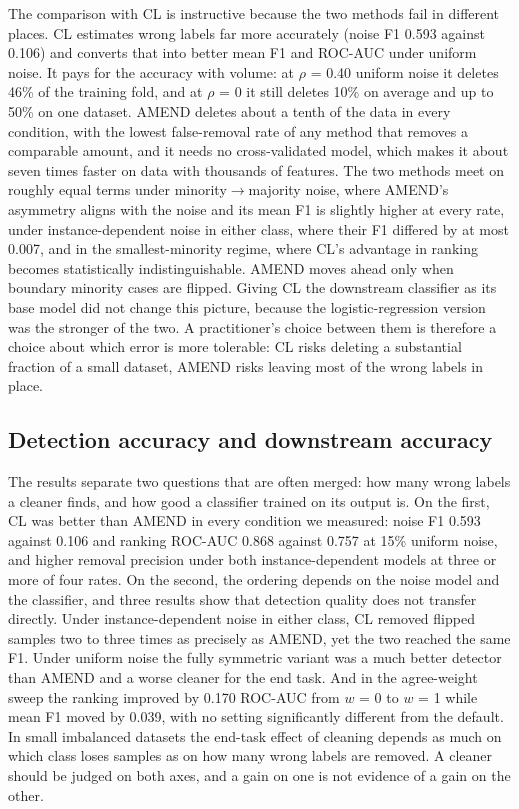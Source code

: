 \documentclass[conference]{IEEEtran}
\begin{document}
The comparison with CL is instructive because the two methods fail in different places. CL estimates wrong labels far more accurately (noise F1 0.593 against 0.106) and converts that into better mean F1 and ROC-AUC under uniform noise. It pays for the accuracy with volume: at $\rho $ = 0.40 uniform noise it deletes 46\% of the training fold, and at $\rho $ = 0 it still deletes 10\% on average and up to 50\% on one dataset. AMEND deletes about a tenth of the data in every condition, with the lowest false-removal rate of any method that removes a comparable amount, and it needs no cross-validated model, which makes it about seven times faster on data with thousands of features. The two methods meet on roughly equal terms under minority$\rightarrow $majority noise, where AMEND's asymmetry aligns with the noise and its mean F1 is slightly higher at every rate, under instance-dependent noise in either class, where their F1 differed by at most 0.007, and in the smallest-minority regime, where CL's advantage in ranking becomes statistically indistinguishable. AMEND moves ahead only when boundary minority cases are flipped. Giving CL the downstream classifier as its base model did not change this picture, because the logistic-regression version was the stronger of the two. A practitioner's choice between them is therefore a choice about which error is more tolerable: CL risks deleting a substantial fraction of a small dataset, AMEND risks leaving most of the wrong labels in place.

\subsection{Detection accuracy and downstream accuracy}\label{sec:detection-accuracy-and-downstream-accuracy}

The results separate two questions that are often merged: how many wrong labels a cleaner finds, and how good a classifier trained on its output is. On the first, CL was better than AMEND in every condition we measured: noise F1 0.593 against 0.106 and ranking ROC-AUC 0.868 against 0.757 at 15\% uniform noise, and higher removal precision under both instance-dependent models at three or more of four rates. On the second, the ordering depends on the noise model and the classifier, and three results show that detection quality does not transfer directly. Under instance-dependent noise in either class, CL removed flipped samples two to three times as precisely as AMEND, yet the two reached the same F1. Under uniform noise the fully symmetric variant was a much better detector than AMEND and a worse cleaner for the end task. And in the agree-weight sweep the ranking improved by 0.170 ROC-AUC from $w$ = 0 to $w$ = 1 while mean F1 moved by 0.039, with no setting significantly different from the default. In small imbalanced datasets the end-task effect of cleaning depends as much on which class loses samples as on how many wrong labels are removed. A cleaner should be judged on both axes, and a gain on one is not evidence of a gain on the other.
\end{document}
